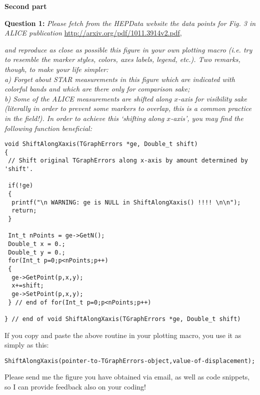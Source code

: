 \documentclass[11pt]{article}
\begin{document}
\bigskip\bigskip

\noindent \textbf{\Large Second part}

\noindent\textbf{Question 1:} {\it Please fetch from the HEPData website the data points for Fig. 3 in ALICE publication} \url{http://arxiv.org/pdf/1011.3914v2.pdf}, {\it and reproduce as close as possible this figure in your own plotting macro (i.e. try to resemble the marker styles, colors, axes labels, legend, etc.). Two remarks, though, to make your life simpler:\\
%
\noindent a) Forget about STAR measurements in this figure which are indicated with colorful bands and which are there only for comparison sake;\\
%
\noindent b) Some of the ALICE measurements are shifted along $x$-axis for visibility sake (literally in order to prevent some markers to overlap, this is a common practice in the field!). In order to achieve this `shifting along $x$-axis', you may find the following function beneficial:

\newpage

{\small
\begin{verbatim}
void ShiftAlongXaxis(TGraphErrors *ge, Double_t shift)
{
 // Shift original TGraphErrors along x-axis by amount determined by 'shift'.
 
 if(!ge)
 {
  printf("\n WARNING: ge is NULL in ShiftAlongXaxis() !!!! \n\n");
  return;
 }
  
 Int_t nPoints = ge->GetN();
 Double_t x = 0.;
 Double_t y = 0.;
 for(Int_t p=0;p<nPoints;p++)
 { 
  ge->GetPoint(p,x,y);
  x+=shift;
  ge->SetPoint(p,x,y);
 } // end of for(Int_t p=0;p<nPoints;p++)

} // end of void ShiftAlongXaxis(TGraphErrors *ge, Double_t shift)
\end{verbatim}
}
%
\noindent If you copy and paste the above routine in your plotting macro, you use it as simply as this:
{\small
\begin{verbatim}
ShiftAlongXaxis(pointer-to-TGraphErrors-object,value-of-displacement);
\end{verbatim}
}
}

\noindent Please send me the figure you have obtained via email, as well as code snippets, so I can provide feedback also on your coding!
\end{document}

